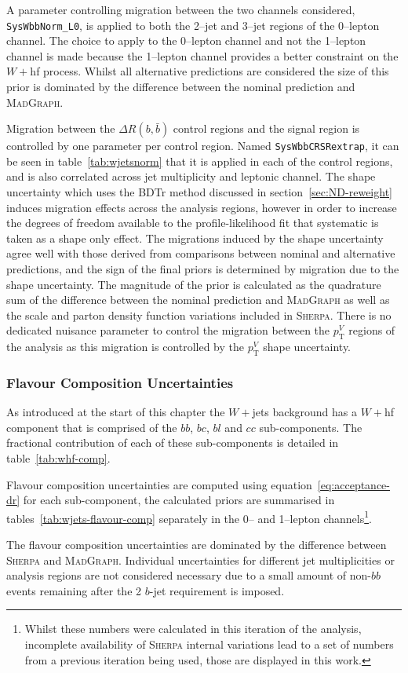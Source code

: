 A parameter controlling migration between the two channels considered,
\texttt{SysWbbNorm\_L0}, is applied to both the 2--jet and 3--jet regions of the
0--lepton channel. The choice to apply to the 0--lepton channel and not the
1--lepton channel is made because the 1--lepton channel provides a better
constraint on the $W+$hf process. Whilst all alternative predictions are
considered the size of this prior is dominated by the difference between the
nominal prediction and \textsc{MadGraph}.

Migration between the $\Delta R(b, \bar{b})$ control regions and the signal
region is controlled by one parameter per control region. Named
\texttt{SysWbbCRSRextrap}, it can be seen in table~\ref{tab:wjetsnorm} that it
is applied in each of the control regions, and is also correlated across jet
multiplicity and leptonic channel. The shape uncertainty which uses the BDTr
method discussed in section~\ref{sec:ND-reweight} induces migration effects
across the analysis regions, however in order to increase the degrees of freedom
available to the profile-likelihood fit that systematic is taken as a shape only
effect. The migrations induced by the shape uncertainty agree well with those
derived from comparisons between nominal and alternative predictions, and the
sign of the final priors is determined by migration due to the shape
uncertainty. The magnitude of the prior is calculated as the quadrature sum of
the difference between the nominal prediction and \textsc{MadGraph} as well as
the scale and parton density function variations included in \textsc{Sherpa}.
There is no dedicated nuisance parameter to control the migration between the
$p_{\mathrm{T}}^V$ regions of the analysis as this migration is controlled by
the $p_{\mathrm{T}}^V$ shape uncertainty.

\subsubsection{Flavour Composition Uncertainties}

As introduced at the start of this chapter the $W+$jets background has a $W+$hf
component that is comprised of the $bb$, $bc$, $bl$ and $cc$ sub-components. The
fractional contribution of each of these sub-components is detailed in
table~\ref{tab:whf-comp}.

Flavour composition uncertainties are computed using
equation~\ref{eq:acceptance-dr} for each sub-component, the calculated priors
are summarised in tables~\ref{tab:wjets-flavour-comp} separately in the 0-- and
1--lepton channels\footnote{Whilst these numbers were calculated in this
  iteration of the analysis, incomplete availability of \textsc{Sherpa} internal
  variations lead to a set of numbers from a previous iteration being used,
  those are displayed in this work.}.

The flavour composition uncertainties are dominated by the difference between
\textsc{Sherpa} and \textsc{MadGraph}. Individual uncertainties for different
jet multiplicities or analysis regions are not considered necessary due to a
small amount of non-$bb$ events remaining after the 2 $b$-jet requirement is
imposed.

